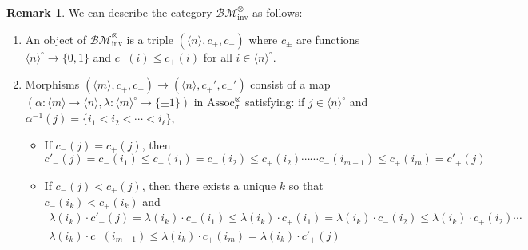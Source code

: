 \documentclass{article}
\newcommand{\Associnv}{\mathrm{Assoc}_\sigma}
\theoremstyle{definition}
\newtheorem{remark}[equation]{Remark}
\begin{document}
\begin{remark}
    We can describe the category $ \mathcal{BM}_\mathrm{inv}^\otimes $ as follows: 
    \begin{enumerate}[label=(\arabic*)]
        \item An object of $ \mathcal{BM}_\mathrm{inv}^\otimes $ is a triple $ (\langle n\rangle,c_+, c_{-}) $ where $ c_{\pm} $ are functions $ \langle n \rangle^\circ \to \{0,1\} $ and $ c_{-}(i) \leq c_{+}(i) $ for all $ i \in \langle n \rangle^\circ $. 
        \item Morphisms $ (\langle m \rangle, c_+, c_{-}) \to (\langle n \rangle, c_{+}', c_{-}') $ consist of a map $ (\alpha \colon \langle m \rangle \to \langle n \rangle, \lambda \colon \langle m \rangle^\circ \to \{\pm 1\}) $ in $ \Associnv^\otimes $ satisfying: if $ j \in \langle n \rangle^\circ $ and $ \alpha^{-1}(j) = \{i_1 < i_2 < \cdots < i_\ell\} $,
        \begin{itemize}
             \item If $ c_{-} (j) = c_+(j) $, then 
                \begin{equation*}
                    c'_{-}(j) = c_{-}(i_1) \leq c_{+}(i_1) = c_{-}(i_2) \leq c_{+}(i_2) \cdots \cdots c_{-}(i_{m-1}) \leq c_{+}(i_m) = c'_{+}(j)
                \end{equation*}
            \item If $ c_{-} (j) < c_+(j) $, then there exists a unique $ k $ so that $ c_{-}(i_k) < c_{+}(i_k) $ and 
                \begin{equation*}
                \begin{split}
                    \lambda(i_k) \cdot c'_{-}(j) = \lambda(i_k) \cdot c_{-}(i_1) \leq \lambda(i_k) \cdot c_{+}(i_1) = \lambda(i_k) \cdot c_{-}(i_2) \leq \lambda(i_k) \cdot c_{+}(i_2)  \cdots \\ \lambda(i_k) \cdot c_{-}(i_{m-1}) \leq \lambda(i_k) \cdot c_{+}(i_m) = \lambda(i_k) \cdot c'_{+}(j)           
                \end{split}
                \end{equation*}
         \end{itemize} 
    \end{enumerate}
\end{remark}
\end{document}
